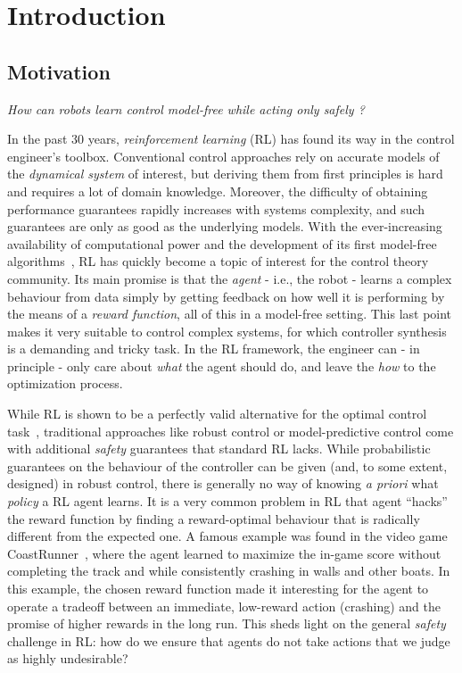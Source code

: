 \chapter{Introduction} \label{chap:intro}

\section{Motivation}
	\emph{How can robots learn control model-free while acting only safely ?} \par
	In the past 30 years, \emph{reinforcement learning} (RL) has found its way in the control engineer's toolbox. Conventional control approaches rely on accurate models of the \emph{dynamical system} of interest, but deriving them from first principles is hard and requires a lot of domain knowledge. Moreover, the difficulty of obtaining performance guarantees rapidly increases with systems complexity, and such guarantees are only as good as the underlying models. With the ever-increasing availability of computational power and the development of its first model-free algorithms~\cite{sutton1988learning}, RL has quickly become a topic of interest for the control theory community. Its main promise is that the\emph{ agent} - i.e., the robot - learns a complex behaviour from data simply by getting feedback on how well it is performing by the means of a \emph{reward function}, all of this in a model-free setting. This last point makes it very suitable to control complex systems, for which controller synthesis is a demanding and tricky task. In the RL framework, the engineer can - in principle - only care about \emph{what} the agent should do, and leave the \emph{how} to the optimization process.\par
	While RL is shown to be a perfectly valid alternative for the optimal control task~\cite[Section\,3.4]{sutton2018reinforcement}, traditional approaches like robust control or model-predictive control come with additional\emph{ safety} guarantees that standard RL lacks. While probabilistic guarantees on the behaviour of the controller can be given (and, to some extent, designed) in robust control, there is generally no way of knowing\emph{ a priori} what\emph{ policy} a RL agent learns. It is a very common problem in RL that agent \enquote{hacks} the reward function by finding a reward-optimal behaviour that is radically different from the expected one. A famous example was found in the video game CoastRunner~\cite{clark2016faulty}, where the agent learned to maximize the in-game score without completing the track and while consistently crashing in walls and other boats. In this example, the chosen reward function made it interesting for the agent to operate a tradeoff between an immediate, low-reward action (crashing) and the promise of higher rewards in the long run. This sheds light on the general\emph{ safety} challenge in RL: how do we ensure that agents do not take actions that we judge as highly undesirable? \par
